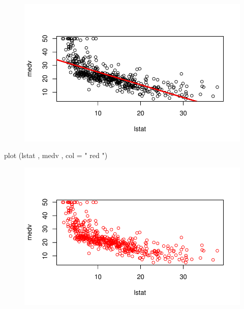 \documentclass[
  letterpaper,
  DIV=11,
  numbers=noendperiod]{scrartcl}
\newenvironment{Shaded}{\begin{snugshade}}{\end{snugshade}}
\newcommand{\AttributeTok}[1]{\textcolor[rgb]{0.40,0.45,0.13}{#1}}
\newcommand{\FunctionTok}[1]{\textcolor[rgb]{0.28,0.35,0.67}{#1}}
\newcommand{\NormalTok}[1]{\textcolor[rgb]{0.00,0.23,0.31}{#1}}
\newcommand{\StringTok}[1]{\textcolor[rgb]{0.13,0.47,0.30}{#1}}
\begin{document}
\begin{figure}[H]

{\centering \includegraphics{Regresion-lineal-simple-y-multiple_files/figure-pdf/unnamed-chunk-12-1.pdf}

}

\end{figure}

\begin{Shaded}
\begin{Highlighting}[]
\FunctionTok{plot}\NormalTok{ (lstat , medv , }\AttributeTok{col =} \StringTok{" red "}\NormalTok{)}
\end{Highlighting}
\end{Shaded}

\begin{figure}[H]

{\centering \includegraphics{Regresion-lineal-simple-y-multiple_files/figure-pdf/unnamed-chunk-12-2.pdf}

}

\end{figure}
\end{document}
